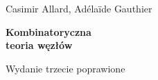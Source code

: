 
\thispagestyle{empty}
{\noindent\fontsize{18pt}{18pt}\selectfont Casimir Allard, Adélaïde Gauthier}

\noindent\makebox[\linewidth]{\rule{\textwidth}{1pt}}

\vspace{10mm}

{\noindent\fontsize{24pt}{24pt}\selectfont \textbf{Kombinatoryczna\\teoria węzłów}}
\vspace{10mm}

{\noindent\fontsize{14pt}{14pt}\selectfont Wydanie trzecie poprawione}

\newpage

